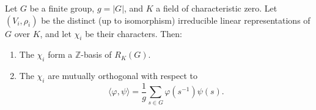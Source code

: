 Let $G$ be a finite group, $g = |G|$, and $K$ a field of characteristic zero. Let $(V_i, \rho_i)$ be the distinct (up to isomorphism) irreducible linear representations of $G$ over $K$, and let $\chi_i$ be their characters. Then:

\begin{enumerate}
\item[(a)] The $\chi_i$ form a $\mathbb{Z}$-basis of $R_K(G)$.
\item[(b)] The $\chi_i$ are mutually orthogonal with respect to
$$\langle \varphi, \psi \rangle = \frac{1}{g} \sum_{s \in G} \varphi(s^{-1})\psi(s).$$
\end{enumerate}
